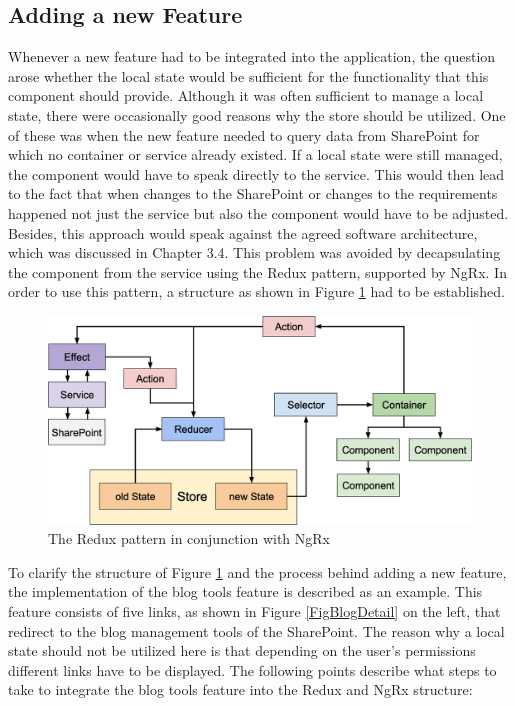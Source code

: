\documentclass[Bachelor,BIF,english]{twbook}
\begin{document}
\subsection{Adding a new Feature}
Whenever a new feature had to be integrated into the application, the question arose whether the local state would be sufficient for the functionality that this component should provide. Although it was often sufficient to manage a local state, there were occasionally good reasons why the store should be utilized. One of these was when the new feature needed to query data from SharePoint for which no container or service already existed. If a local state were still managed, the component would have to speak directly to the service. This would then lead to the fact that when changes to the SharePoint or changes to the requirements happened not just the service but also the component would have to be adjusted. Besides, this approach would speak against the agreed software architecture, which was discussed in Chapter 3.4. This problem was avoided by decapsulating the component from the service using the Redux pattern, supported by NgRx. In order to use this pattern, a structure as shown in Figure \ref{Fig6} had to be established.
\\[\baselineskip]
\begin{figure}[!htbp]
\centering
\includegraphics[width=0.85\linewidth]{PICs/ngrx_redux_structure.eps}
\caption{The Redux pattern in conjunction with NgRx}\label{Fig6}
\end{figure}
To clarify the structure of Figure \ref{Fig6} and the process behind adding a new feature, the implementation of the blog tools feature is described as an example. This feature consists of five links, as shown in Figure \ref{FigBlogDetail} on the left, that redirect to the blog management tools of the SharePoint. The reason why a local state should not be utilized here is that depending on the user's permissions different links have to be displayed. The following points describe what steps to take to integrate the blog tools feature into the Redux and NgRx structure:
\end{document}
